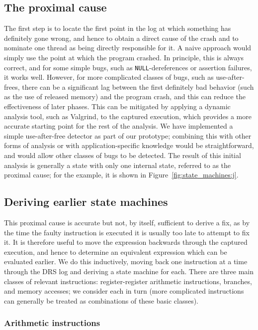\documentclass[10pt,letter,twocolumn]{sigplanconf}
\begin{document}
\subsection{The proximal cause}
\label{sect:prox_cause}
The first step is to locate the first point in the log at which
something has definitely gone wrong, and hence to obtain a direct
cause of the crash and to nominate one thread as being directly
responsible for it.  A naive approach would simply use the point at
which the program crashed.  In principle, this is always correct, and
for some simple bugs, such as \verb|NULL|-dereferences or assertion
failures, it works well.  However, for more complicated classes of
bugs, such as use-after-frees, there can be a significant lag between
the first definitely bad behavior (such as the use of released memory)
and the program crash, and this can reduce the effectiveness of later
phases.  This can be mitigated by applying a dynamic analysis tool,
such as Valgrind\cite{Nethercote2007}, to the captured execution,
which provides a more accurate starting point for the rest of the
analysis.  We have implemented a simple use-after-free detector as
part of our prototype; combining this with other forms of analysis or
with application-specific knowledge would be straightforward, and
would allow other classes of bugs to be detected.  The result of this
initial analysis is generally a state with only one internal state,
referred to as the proximal cause; for the example, it is shown in
Figure~\ref{fig:state_machines:j}.

\subsection{Deriving earlier state machines}
This proximal cause is accurate but not, by itself, sufficient to
derive a fix, as by the time the faulty instruction is executed it is
usually too late to attempt to fix it.  It is therefore useful to move
the expression backwards through the captured execution, and hence to
determine an equivalent expression which can be evaluated earlier.  We
do this inductively, moving back one instruction at a time through the
DRS log and deriving a state machine for each.  There are three main
classes of relevant instructions: register-register arithmetic
instructions, branches, and memory accesses; we consider each in turn
(more complicated instructions can generally be treated as
combinations of these basic classes).

\subsubsection{Arithmetic instructions}
\end{document}
